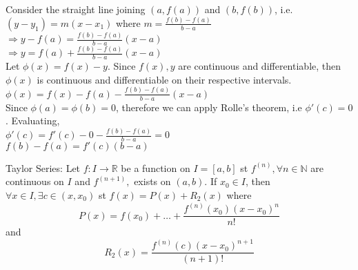 \documentclass{article}
\begin{document}
\begin{tcolorbox}[colback=lightgray!10,colframe=lightgray!10, fontupper=\linespread{1.5}\selectfont]
	Consider the straight line joining $(a,f(a))$ and $(b,f(b))$, i.e. \\
	$(y-y_1)=m(x-x_1)$ where $m = \frac{f(b) - f(a)}{b-a}$ \\	
	$\Rightarrow y - f(a) = \frac{f(b) - f(a)}{b-a} (x-a)$ \\
	$\Rightarrow y = f(a) + \frac{f(b) - f(a)}{b-a} (x-a)$ \\	
	Let $\phi(x) = f(x) - y$. Since $f(x), y$ are continuous and differentiable, then $\phi(x)$ is continuous and differentiable on their respective intervals. \\
	$\phi(x) = f(x) - f(a) - \frac{f(b)-f(a)}{b-a}(x-a)$ \\	
	Since $\phi(a) = \phi(b) = 0$, therefore we can apply Rolle's theorem, i.e $\phi'(c) = 0$. Evaluating, \\	
	$\phi'(c) = f'(c) - 0 - \frac{f(b)-f(a)}{b-a} = 0$ \\	
	$f(b) - f(a) = f'(c)(b-a)$
\end{tcolorbox}

Taylor Series: Let $f:I \rightarrow \mathbb{R}$ be a function on $I=[a,b]$ st $f^{(n)}, \forall n \in \mathbb{N}$ are continuous on $I$ and $f^{(n+1)},$ exists on $(a,b)$. If $x_0 \in I$, then $\forall x \in I, \exists c \in (x,x_0)$ st $f(x) = P(x) + R_2(x)$ where 
$$P(x) = f(x_0) + \dots + \frac{f^{(n)}(x_0)(x-x_0)^n}{n!}$$ and $$R_2(x) = \frac{f^{(n)}(c)(x-x_0)^{n+1}}{(n+1)!}$$
\end{document}
